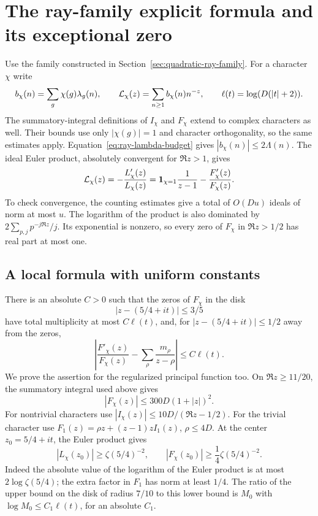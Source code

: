 \section{The ray-family explicit formula and its exceptional zero}
\label{sec:ray-explicit}

Use the family constructed in Section~\ref{sec:quadratic-ray-family}.
For a character \(\chi\) write
\[
 b_\chi(n)=\sum_g\chi(g)\lambda_g(n),\qquad
 {\cal L}_\chi(z)=\sum_{n\geq1}b_\chi(n)n^{-z},\qquad
                \ell(t)=\log(D(|t|+2)).
\]
The summatory-integral definitions of \(I_\chi\) and \(F_\chi\)
extend to complex characters as well. Their bounds use only
\(|\chi(g)|=1\) and character orthogonality, so the same estimates
apply. Equation~\eqref{eq:ray-lambda-budget} gives
\(|b_\chi(n)|\leq2\Lambda(n)\).
The ideal Euler product, absolutely convergent for \(\Re z>1\), gives
\[
 {\cal L}_\chi(z)=-\frac{L'_\chi(z)}{L_\chi(z)}
       ={\bf1}_{\chi=1}\frac1{z-1}-\frac{F'_\chi(z)}{F_\chi(z)}.
\]
To check convergence, the counting estimates give a total of
\(O(Du)\) ideals of norm at most \(u\).
The logarithm of the product is also dominated by
\(2\sum_{p,j}p^{-j\Re z}/j\).
Its exponential is nonzero, so every zero of \(F_\chi\) in
\(\Re z>1/2\) has real part at most one.

\subsection{A local formula with uniform constants}

There is an absolute \(C>0\) such that the zeros of \(F_\chi\)
in the disk
\[
             |z-(5/4+it)|\leq3/5
\]
have total multiplicity at most \(C\ell(t)\), and, for
\(|z-(5/4+it)|\leq1/2\) away from the zeros,
\begin{equation}
 \label{eq:ray-local-log}
 \left|\frac{F'_\chi(z)}{F_\chi(z)}
             -\sum_\rho\frac{m_\rho}{z-\rho}\right|
                                  \leq C\ell(t).
\end{equation}
We prove the assertion for the regularized principal function too.
On \(\Re z\geq11/20\), the summatory integral used above gives
\[
                    |F_\chi(z)|\leq300D(1+|z|)^2.
\]
For nontrivial characters use
\(|I_\chi(z)|\leq10D/(\Re z-1/2)\).
For the trivial character use
\(F_1(z)=\rho z+(z-1)zI_1(z)\), \(\rho\leq4D\).
At the center \(z_0=5/4+it\), the Euler product gives
\[
 |L_\chi(z_0)|\geq\zeta(5/4)^{-2},\qquad
                  |F_\chi(z_0)|\geq\frac14\zeta(5/4)^{-2}.
\]
Indeed the absolute value of the logarithm of the Euler product is
at most \(2\log\zeta(5/4)\); the extra factor in \(F_1\) has norm
at least \(1/4\).
The ratio of the upper bound on the disk of radius \(7/10\) to
this lower bound is \(M_0\) with
\(\log M_0\leq C_1\ell(t)\), for an absolute \(C_1\).

